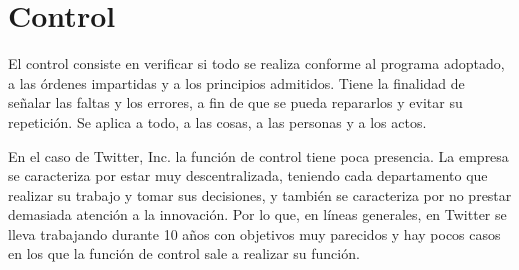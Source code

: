 \section{Control}

El control consiste en verificar si todo se realiza conforme al programa adoptado, a las órdenes impartidas y a los principios admitidos. Tiene la finalidad de señalar las faltas y los errores, a fin de que se pueda repararlos y evitar su repetición. Se aplica a todo, a las cosas, a las personas y a los actos. 

En el caso de Twitter, Inc. la función de control tiene poca presencia. La empresa se caracteriza por estar muy descentralizada, teniendo cada departamento que realizar su trabajo y tomar sus decisiones, y también se caracteriza por no prestar demasiada atención a la innovación. Por lo que, en líneas generales, en Twitter se lleva trabajando durante 10 años con objetivos muy parecidos y hay pocos casos en los que la función de control sale a realizar su función.